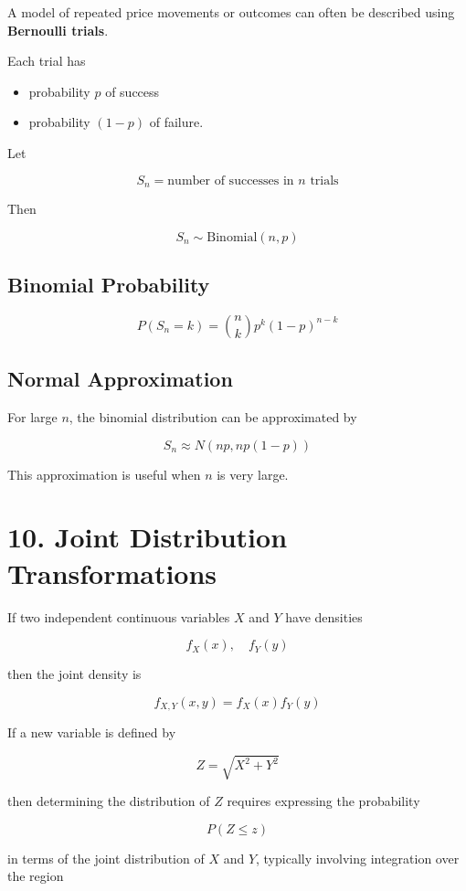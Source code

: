 \documentclass[12pt]{article}
\begin{document}
A model of repeated price movements or outcomes can often be described using \textbf{Bernoulli trials}.

Each trial has

\begin{itemize}
\item probability $p$ of success
\item probability $(1-p)$ of failure.
\end{itemize}

Let

\[
S_n = \text{number of successes in } n \text{ trials}
\]

Then

\[
S_n \sim \text{Binomial}(n,p)
\]

\subsection*{Binomial Probability}

\[
P(S_n=k)=\binom{n}{k}p^k(1-p)^{n-k}
\]

\subsection*{Normal Approximation}

For large $n$, the binomial distribution can be approximated by

\[
S_n \approx N(np, np(1-p))
\]

This approximation is useful when $n$ is very large.

\section*{10. Joint Distribution Transformations}

If two independent continuous variables $X$ and $Y$ have densities

\[
f_X(x), \quad f_Y(y)
\]

then the joint density is

\[
f_{X,Y}(x,y)=f_X(x)f_Y(y)
\]

If a new variable is defined by

\[
Z=\sqrt{X^2+Y^2}
\]

then determining the distribution of $Z$ requires expressing the probability

\[
P(Z\le z)
\]

in terms of the joint distribution of $X$ and $Y$, typically involving integration over the region
\end{document}
